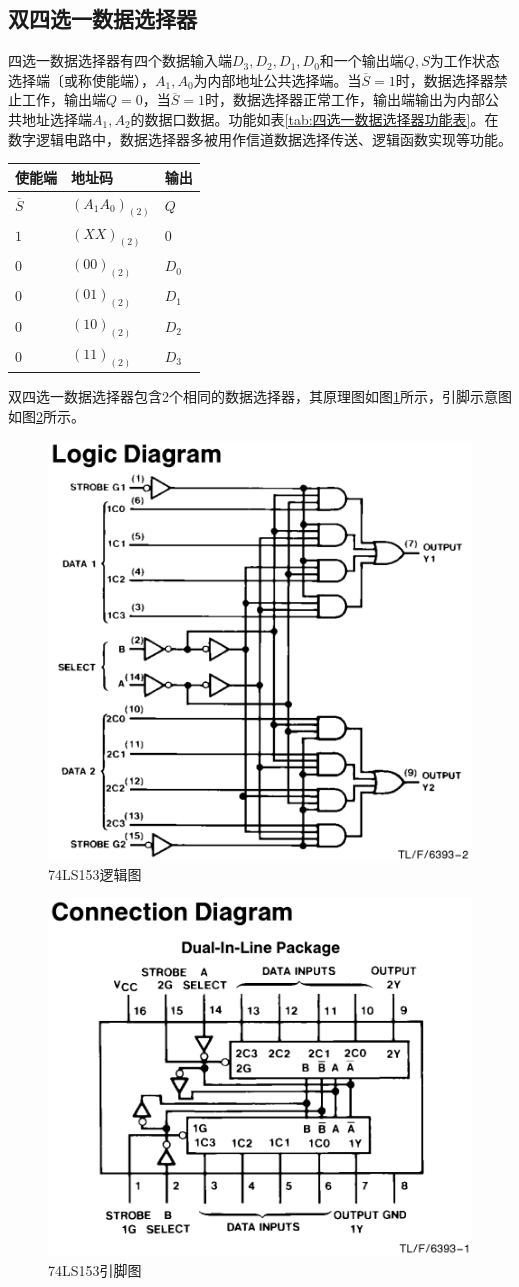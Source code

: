 \documentclass{ctexrep}
\begin{document}
\newpage
\subsection{双四选一数据选择器}%
\label{sub:双四选一数据选择器}

四选一数据选择器有四个数据输入端$D_3,D_2,D_1,D_0$和一个输出端$Q,S$为工作状态选择端〔或称使能端），$A_1,A_0$为内部地址公共选择端。当$\overline{S}=1$时，数据选择器禁止工作，输出端$Q=0$，当$\overline{S}=1$时，数据选择器正常工作，输出端输出为内部公共地址选择端$A_1,A_2$的数据口数据。功能如表\ref{tab:四选一数据选择器功能表}。在数字逻辑电路中，数据选择器多被用作信道数据选择传送、逻辑函数实现等功能。

\begin{table}[htbp]
	\centering
	\caption{四选一数据选择器功能表}
	\label{tab:四选一数据选择器功能表}
	\begin{longtabu}to.5
		\toprule
		使能端 & 地址码 & 输出 \\\midrule
		$\overline{S}$&$(A_1A_0)_{(2)}$  &$Q$  \\
		$1$ &$(XX)_{(2)}$& 0 \\
		$0$ &$(00)_{(2)}$& $D_0$ \\
		$0$&$(01)_{(2)}$& $D_1$\\
		$0$&$(10)_{(2)}$  &$D_2$  \\
		$0$&$(11)_{(2)}$  &$D_3$  \\
		\bottomrule
	\end{longtabu}
\end{table}

\newpage
双四选一数据选择器包含2个相同的数据选择器，其原理图如图\ref{fig:74LS153逻辑图}所示，引脚示意图如图\ref{fig:74LS153引脚图}所示。
\begin{figure}[htbp]
	\centering
	\includegraphics[width=.4\linewidth]{74LS153a.png}
	\caption{74LS153逻辑图}
	\label{fig:74LS153逻辑图}
\end{figure}

\begin{figure}[htbp]
	\centering
	\includegraphics[width=.4\linewidth]{74LS153.png}
	\caption{74LS153引脚图}
	\label{fig:74LS153引脚图}
\end{figure}
\end{document}
